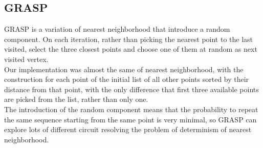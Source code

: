 \subsection{GRASP}
GRASP is a variation of nearest neighborhood that introduce a random component. On each iteration, rather than picking the nearest point to the last visited, select the three closest points and choose one of them at random as next visited vertex. \\
Our implementation was almost the same of nearest neighborhood, with the construction for each point of the initial list of all other points sorted by their distance from that point, with the only difference that first three available points are picked from the list, rather than only one. \\
The introduction of the random component means that the probability to repeat the same sequence starting from the same point is very minimal, so GRASP can explore lots of different circuit resolving the problem of determinism of nearest neighborhood. 

